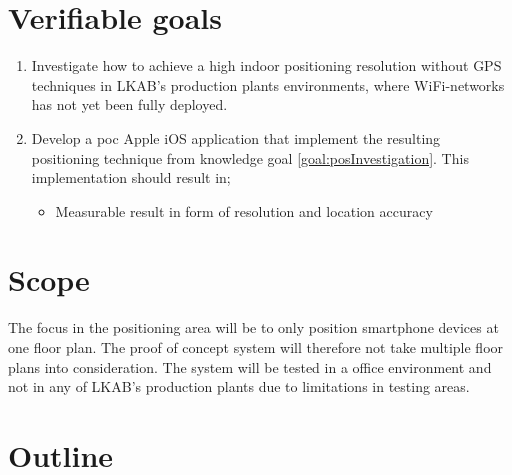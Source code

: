 \section{Verifiable goals}\label{sec:introGoals}
\begin{enumerate}
\item \label{goal:posInvestigation}
Investigate how to achieve a high indoor positioning resolution without GPS
techniques in LKAB's production plants environments, where WiFi-networks has
not yet been fully deployed.

\item \label{goal:poc}
Develop a \acrfull{poc} Apple iOS application that implement the resulting
positioning technique from knowledge goal \ref{goal:posInvestigation}. This
implementation should result in;
\begin{itemize}
\item Measurable result in form of resolution and location accuracy
\end{itemize}
\end{enumerate}


\section{Scope}
The focus in the positioning area will be to only position smartphone devices at one floor plan.
The proof of concept system will therefore not take multiple floor plans into consideration.
The system will be tested in a office environment and not in any of LKAB's production plants due to
limitations in testing areas.


\section{Outline}
